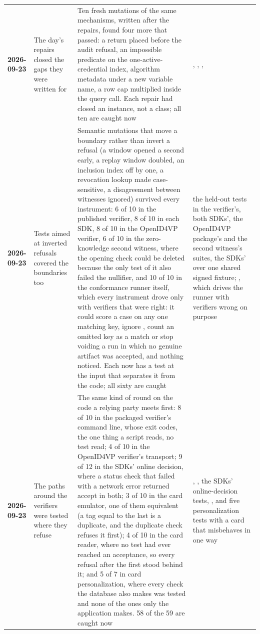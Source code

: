 {\begin{xltabular}{\textwidth}{>{\bfseries\hspace{0pt}}p{0.62in} >{\RaggedRight\arraybackslash\hspace{0pt}}X >{\RaggedRight\arraybackslash\hspace{0pt}}X >{\RaggedRight\arraybackslash\hspace{0pt}}p{1.6in}}
2026-09-23 & The day's repairs closed the gaps they were written for & Ten fresh mutations of the same mechanisms, written after the repairs, found four more that passed: a return placed before the audit refusal, an impossible predicate on the one-active-credential index, algorithm metadata under a new variable name, a row cap multiplied inside the query call. Each repair had closed an instance, not a class; all ten are caught now & , , ,  \\
2026-09-23 & Tests aimed at inverted refusals covered the boundaries too & Semantic mutations that move a boundary rather than invert a refusal (a window opened a second early, a replay window doubled, an inclusion index off by one, a revocation lookup made case-sensitive, a disagreement between witnesses ignored) survived every instrument: 6 of 10 in the published verifier, 8 of 10 in each SDK, 8 of 10 in the OpenID4VP verifier, 6 of 10 in the zero-knowledge second witness, where the opening check could be deleted because the only test of it also failed the nullifier, and 10 of 10 in the conformance runner itself, which every instrument drove only with verifiers that were right: it could score a case on any one matching key, ignore , count an omitted key as a match or stop voiding a run in which no genuine artifact was accepted, and nothing noticed. Each now has a test at the input that separates it from the code; all sixty are caught & the held-out tests in the verifier's, both SDKs', the OpenID4VP package's and the second witness's suites, the SDKs' over one shared signed fixture; , which drives the runner with verifiers wrong on purpose \\
2026-09-23 & The paths around the verifiers were tested where they refuse & The same kind of round on the code a relying party meets first: 8 of 10 in the packaged verifier's command line, whose exit codes, the one thing a script reads, no test read; 4 of 10 in the OpenID4VP verifier's transport; 9 of 12 in the SDKs' online decision, where a status check that failed with a network error returned accept in both; 3 of 10 in the card emulator, one of them equivalent (a tag equal to the last is a duplicate, and the duplicate check refuses it first); 4 of 10 in the card reader, where no test had ever reached an acceptance, so every refusal after the first stood behind it; and 5 of 7 in card personalization, where every check the database also makes was tested and none of the ones only the application makes. 58 of the 59 are caught now & , , the SDKs' online-decision tests, , and five personalization tests with a card that misbehaves in one way \\

\end{xltabular}}
